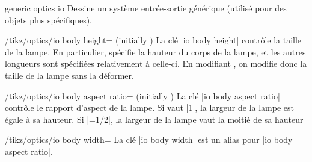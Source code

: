 \documentclass[a4paper]{ltxdoc}
\begin{document}
\begin{shape}{generic optics io}
Dessine un système entrée-sortie générique (utilisé pour des objets plus spécifiques).

\begin{codeexample}[width=6cm]
\end{codeexample}


\begin{key}{/tikz/optics/io body height= (initially )}
    La clé |io body height| contrôle la taille de la lampe. En particulier,  spécifie la hauteur du corps de la lampe,
    et les autres longueurs sont spécifiées relativement à celle-ci. En modifiant , on modifie donc la taille de la lampe
    sans la déformer.

    \begin{codeexample}[]
    \end{codeexample}
\end{key}

\begin{key}{/tikz/optics/io body aspect ratio= (initially )}
    La clé |io body aspect ratio| contrôle le rapport d'aspect de la lampe. Si  vaut |1|, la largeur de la lampe est égale à sa hauteur.
    Si |=1/2|, la largeur de la lampe vaut la moitié de sa hauteur

    \begin{codeexample}[]
    \end{codeexample}
\end{key}

\begin{stylekey}{/tikz/optics/io body width=}
La clé |io body width| est un alias pour |io body aspect ratio|.
\end{stylekey}



\end{shape}
\end{document}

